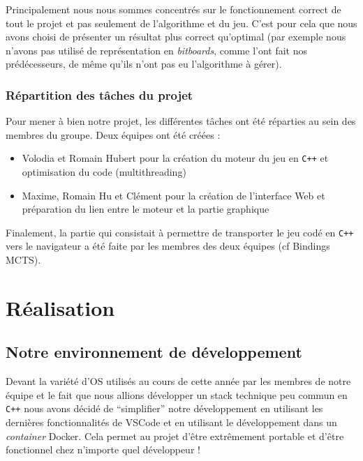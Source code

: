 \documentclass[a4paper,11pt]{article}
\providecommand{\tightlist}{%
  \setlength{\itemsep}{0pt}\setlength{\parskip}{0pt}}
\begin{document}
Principalement nous nous sommes concentrés sur le fonctionnement correct
de tout le projet et pas seulement de l'algorithme et du jeu. C'est pour
cela que nous avons choisi de présenter un résultat plus correct
qu'optimal (par exemple nous n'avons pas utilisé de représentation en
\emph{bitboards}, comme l'ont fait nos prédécesseurs, de même qu'ils
n'ont pas eu l'algorithme à gérer).

\hypertarget{ruxe9partition-des-tuxe2ches-du-projet}{%
\subsubsection{Répartition des tâches du
projet}\label{ruxe9partition-des-tuxe2ches-du-projet}}

Pour mener à bien notre projet, les différentes tâches ont été réparties
au sein des membres du groupe. Deux équipes ont été créées :

\begin{itemize}
\tightlist
\item
  Volodia et Romain Hubert pour la création du moteur du jeu en
  \texttt{C++} et optimisation du code (multithreading)
\item
  Maxime, Romain Hu et Clément pour la création de l'interface Web et
  préparation du lien entre le moteur et la partie graphique
\end{itemize}

Finalement, la partie qui consistait à permettre de transporter le jeu
codé en \texttt{C++} vers le navigateur a été faite par les membres des
deux équipes (cf Bindings MCTS).

\hypertarget{ruxe9alisation}{%
\section{Réalisation}\label{ruxe9alisation}}

\hypertarget{notre-environnement-de-duxe9veloppement}{%
\subsection{Notre environnement de
développement}\label{notre-environnement-de-duxe9veloppement}}

Devant la variété d'OS utilisés au cours de cette année par les membres
de notre équipe et le fait que nous allions développer un stack
technique peu commun en \texttt{C++} nous avons décidé de ``simplifier''
notre développement en utilisant les dernières fonctionnalités de VSCode
et en utilisant le développement dans un \emph{container} Docker. Cela
permet au projet d'être extrêmement portable et d'être fonctionnel chez
n'importe quel développeur !
\end{document}
